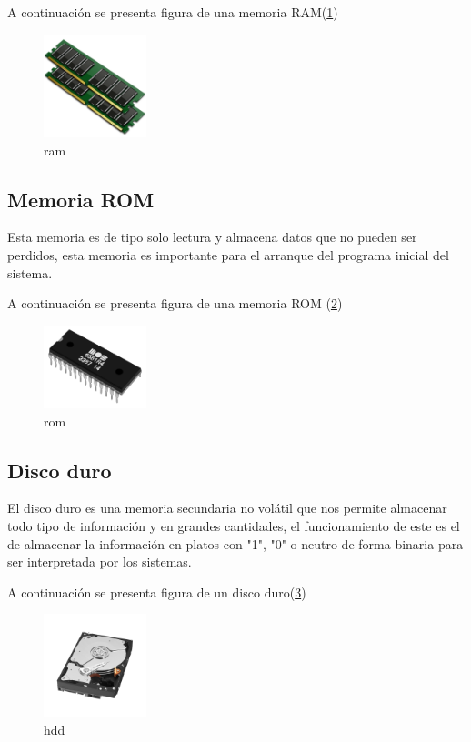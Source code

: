 \documentclass{article}
\begin{document}
A continuación se presenta figura de una memoria RAM(\ref{fig:ram})
\begin{figure}[h]
\includegraphics[width=3cm]{ram.png}
\centering
\caption{ram}
\label{fig:ram}
\end{figure}

\subsection{Memoria ROM}
Esta memoria es de tipo solo lectura y almacena datos que no pueden ser perdidos, esta memoria es importante para el arranque del programa inicial del sistema. \cite{TecnologiaInformatica}

A continuación se presenta figura de una memoria ROM (\ref{fig:rom})
\begin{figure}[h]
\includegraphics[width=3cm]{rom.png}
\centering
\caption{rom}
\label{fig:rom}
\end{figure}
\subsection{Disco duro}
El disco duro es una memoria secundaria no volátil que nos permite almacenar todo tipo de información y en grandes cantidades, el funcionamiento de este es el de almacenar la información en platos con "1", "0" o neutro de forma binaria para ser interpretada por los sistemas.\cite{TecnologiaInformatica}

A continuación se presenta figura de un disco duro(\ref{fig:hdd})
\begin{figure}[h]
\includegraphics[width=3cm]{hdd.png}
\centering
\caption{hdd}
\label{fig:hdd}
\end{figure}
\end{document}
